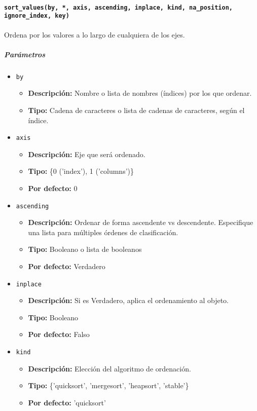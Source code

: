 \paragraph{\texttt{sort\_values(by, *, axis, ascending, inplace, kind, na\_position, ignore\_index, key)}} Ordena por los valores a lo largo de cualquiera de los ejes.
\subparagraph{\textbf{Parámetros}}
\begin{itemize}
\item \texttt{by}
\begin{itemize}
\item \textbf{Descripción:} Nombre o lista de nombres (índices) por los que ordenar.
\item \textbf{Tipo:} Cadena de caracteres o lista de cadenas de caracteres, según el índice.
\end{itemize}
\item \texttt{axis}
\begin{itemize}
\item \textbf{Descripción:} Eje que será ordenado.
\item \textbf{Tipo:} \{0 ('index'), 1 ('columns')\}
\item \textbf{Por defecto:} 0
\end{itemize}
\item \texttt{ascending}
\begin{itemize}
\item \textbf{Descripción:} Ordenar de forma ascendente vs descendente. Especifique una lista para múltiples órdenes de clasificación.
\item \textbf{Tipo:} Booleano o lista de booleanos
\item \textbf{Por defecto:} Verdadero
\end{itemize}
\item \texttt{inplace}
\begin{itemize}
\item \textbf{Descripción:} Si es Verdadero, aplica el ordenamiento al objeto.
\item \textbf{Tipo:} Booleano
\item \textbf{Por defecto:} Falso
\end{itemize}
\item \texttt{kind}
\begin{itemize}
\item \textbf{Descripción:} Elección del algoritmo de ordenación.
\item \textbf{Tipo:} \{'quicksort', 'mergesort', 'heapsort', 'stable'\}
\item \textbf{Por defecto:} 'quicksort'

\end{itemize}
\end{itemize}
